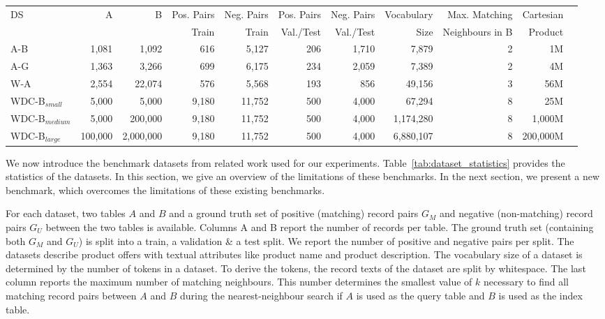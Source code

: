\documentclass[sigconf,nonacm]{acmart}
\begin{document}
\begin{table*}[t]
\caption{Dataset statistics of the benchmarked datasets.}
\label{tab:dataset_statistics}
\begin{tabular}{@{}lrrrrrrrrrr@{}}
\toprule
DS    & A    & B      & Pos. Pairs & Neg. Pairs & Pos. Pairs & Neg. Pairs & Vocabulary & Max. Matching & Cartesian\\
    &     &      & Train & Train & Val./Test & Val./Test & Size & Neighbours in B  & Product\\ \midrule
A-B   & 1,081 & 1,092    & 616              & 5,127             & 206                 & 1,710                & 7,879 & 2         &       1M        \\
A-G   & 1,363 & 3,266  & 699              & 6,175             & 234                 & 2,059               & 7,389  & 2           &   4M          \\
W-A   & 2,554 & 22,074   & 576              & 5,568             & 193                 & 856               & 49,156  & 3           &   56M          \\
WDC-B$_{small}$ & 5,000 & 5,000  & 9,180             & 11,752            & 500                 & 4,000             & 67,294   & 8         &     25M          \\
WDC-B$_{medium}$ & 5,000 & 200,000  & 9,180             & 11,752            & 500                 & 4,000             & 1,174,280   & 8      &     1,000M             \\
WDC-B$_{large}$ & 100,000 & 2,000,000  & 9,180             & 11,752            & 500                 & 4,000             & 6,880,107   & 8         &     200,000M       \\\bottomrule
\end{tabular}
\end{table*}


We now introduce the benchmark datasets from related work used for our experiments. Table~\ref{tab:dataset_statistics} provides the statistics of the datasets. In this section, we give an overview of the limitations of these benchmarks. In the next section, we present a new benchmark, which overcomes the limitations of these existing benchmarks.

For each dataset, two tables $A$ and $B$ and a ground truth set of positive (matching) record pairs $G_M$ and negative (non-matching) record pairs $G_U$ between the two tables is available.
Columns A and B report the number of records per table.
The ground truth set (containing both $G_M$ and $G_U$) is split into a train, a validation \& a test split.
We report the number of positive and negative pairs per split.
The datasets describe product offers with textual attributes like product name and product description.
The vocabulary size of a dataset is determined by the number of tokens in a dataset. To derive the tokens, the record texts of the dataset are split by whitespace.
The last column reports the maximum number of matching neighbours.
This number determines the smallest value of $k$ necessary to find all matching record pairs between $A$ and $B$ during the nearest-neighbour search if $A$ is used as the query table and $B$ is used as the index table.
\end{document}

